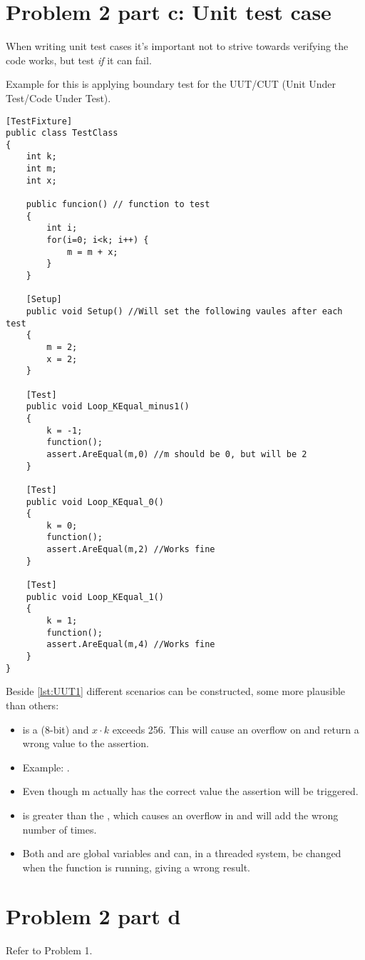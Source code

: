 \documentclass[Main_Assignment4]{subfiles}
\begin{document}
\section{Problem 2 part c: Unit test case}
When writing unit test cases it's important not to strive towards verifying the code works, but test \emph{if} it can fail.

Example for this is applying boundary test for the UUT/CUT (Unit Under Test/Code Under Test). 

\begin{lstlisting}[caption=Unit tests -- different k-values, style=Code-C++, label=lst:UUT1]
[TestFixture]
public class TestClass
{
	int k;
	int m;
	int x;

	public funcion() // function to test
	{
		int i;
		for(i=0; i<k; i++) {
			m = m + x;
		}
	}

	[Setup]
	public void Setup() //Will set the following vaules after each test
	{
		m = 2;
		x = 2;
	}

	[Test]
	public void Loop_KEqual_minus1()
	{
		k = -1;
		function();
		assert.AreEqual(m,0) //m should be 0, but will be 2
	}

	[Test]
	public void Loop_KEqual_0()
	{
		k = 0;
		function();
		assert.AreEqual(m,2) //Works fine
	}

	[Test]
	public void Loop_KEqual_1()
	{
		k = 1;
		function();
		assert.AreEqual(m,4) //Works fine
	}
}
\end{lstlisting}

Beside \codeTitle \ref{lst:UUT1} different scenarios can be constructed, some more plausible than others:
\begin{itemize}
	\item {}  is a  (8-bit) and $x \cdot k$ exceeds 256. This will cause an overflow on  and return a wrong value to the assertion.
	\item[] Example: .
	\item[] Even though m actually has the correct value the assertion will be triggered.

	\item {} is greater than the , which causes an overflow in  and will add  the wrong number of times.

	\item Both  and  are global variables and can, in a threaded system, be changed when the function is running, giving a wrong result.
\end{itemize}
\section{Problem 2 part d}
Refer to Problem 1.
\end{document}
